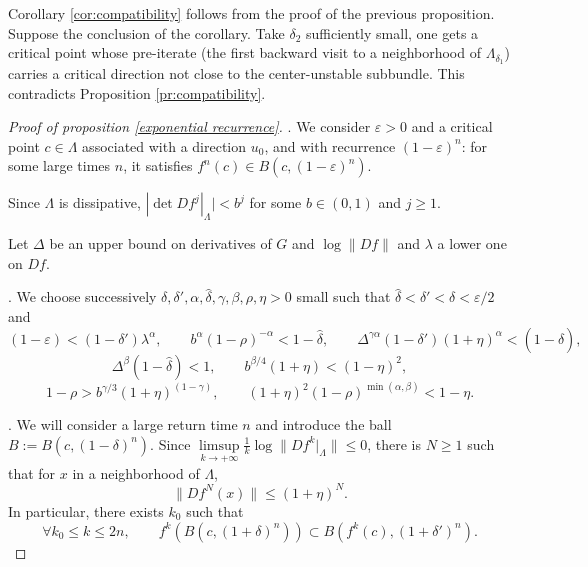 \documentclass[a4paper,11pt]{article}
\theoremstyle{definition}
\def\La{\Lambda}
\def\de{\delta}
\def\La{\Lambda}
\begin{document}
\vskip 5pt


Corollary \ref{cor:compatibility} follows from the proof of the previous proposition. Suppose  the conclusion of the corollary. Take $\de_2$ sufficiently small,   one gets a critical point whose pre-iterate   (the first backward visit to a neighborhood of $\La_{\de_1}$) carries a critical direction not close to the center-unstable subbundle. This contradicts Proposition \ref{pr:compatibility}.

\vskip 5pt

 \begin{proof}[Proof of proposition \ref{exponential recurrence}]
 
 
 . We consider $\varepsilon>0$ and a
 critical point $c\in \La$ associated with a direction $u_0$, and with recurrence $(1-\varepsilon)^n$: for some large times $n$,
it satisfies $f^n(c)\in B(c,(1-\varepsilon)^n)$.
\medskip

\noindent
Since $\La$ is dissipative, $|\det Df^j |_\La|<b^j$ for some $b\in (0,1)$ and $j\geq 1$.
\medskip

\noindent
Let $\Delta$ be an upper bound on derivatives of $G$ and $\log\|Df\|$ and $\lambda$ a lower one on $Df$.
\bigskip

. We choose successively $\delta,\delta',\alpha,\widehat \delta,\gamma,\beta,\rho,\eta>0$ small such that
$\widehat \delta<\delta'<\delta<\varepsilon/2$ and
\begin{equation}\label{e.choice-alpha}
(1-\varepsilon)<(1-\delta')\lambda^{\alpha},\qquad b^\alpha(1-\rho)^{-\alpha}<1-\widehat \delta,\qquad \Delta^{\gamma\alpha}(1-\delta')(1+\eta)^{\alpha}<(1-\widehat \delta),
\end{equation}
\begin{equation}\label{e.choice-beta}
\Delta^{\beta} (1-\widehat \delta)<1, \qquad b^{\beta/4}(1+\eta)<(1-\eta)^2,
\end{equation}
\begin{equation}\label{e.choice-eta}
1-\rho>b^{\gamma/3}(1+\eta)^{(1-\gamma)},\qquad (1+\eta)^2(1-\rho)^{\min(\alpha,\beta)}<1-\eta.
\end{equation}

. We will consider a large return time $n$ and introduce the ball $B:=B(c,(1-\delta)^n)$.\newline
Since $\underset{k\to +\infty}\limsup \tfrac 1 k \log \|Df^k|_\La\|\leq 0$,
there is $N\geq 1$ such that for $x$ in a neighborhood of $\La$,
\begin{equation}\label{e.bounds}
\|Df^{N}(x)\|\leq (1+\eta)^N.
\end{equation}
In particular, there exists $k_0$ such that
$$\forall k_0\leq k\leq 2n,\qquad f^k(B(c,(1+\delta)^n))\subset B(f^k(c),(1+\delta')^n).$$


\end{proof}
\end{document}
